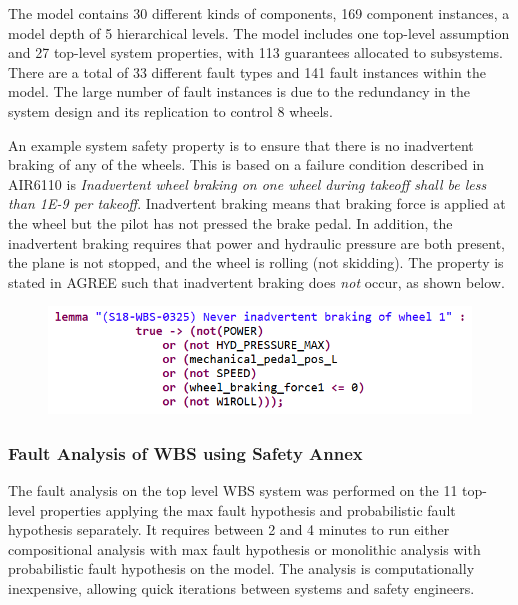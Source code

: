 The model contains 30 different kinds of components, 169 component instances, a model depth of 5 hierarchical levels.  The model includes one top-level assumption and  27 top-level system properties, with 113 guarantees allocated to subsystems.  There are a total of 33 different fault types and 141 fault instances within the model.  The large number of fault instances is due to the redundancy in the system design and its replication to control 8 wheels. 

An example system safety property is to ensure that there is no inadvertent braking of any of the wheels. This is based on a failure condition described in AIR6110 is \textit{Inadvertent wheel braking on one wheel during takeoff shall be less than 1E-9 per takeoff}. 
Inadvertent braking means that braking force is applied at the wheel but the pilot has not pressed the brake pedal.  In addition, the inadvertent braking requires that power and hydraulic pressure are both present, the plane is not stopped, and the wheel is rolling (not skidding). 
The property is stated in AGREE such that inadvertent braking does \textit{not} occur, as shown below. 

\begin{figure}[h!]
	\vspace{-0.2in}
	\begin{center}
		\includegraphics[width=.7\textwidth]{images/inadvertent_braking.png}
	\end{center}
	\vspace{-0.3in}
	\label{fig:inadvertent_braking}
\end{figure}

\subsubsection{Fault Analysis of WBS using Safety Annex}

The fault analysis on the top level WBS system was performed on the 11 top-level properties applying the max fault hypothesis and probabilistic fault hypothesis separately. It requires between 2 and 4 minutes to run either compositional analysis with max fault hypothesis or monolithic analysis with probabilistic fault hypothesis on the model. The analysis is computationally inexpensive, allowing quick iterations between systems and safety engineers.


